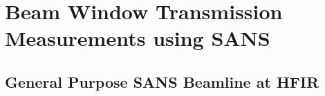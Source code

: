 





\section{Beam Window Transmission Measurements using SANS}

\subsection{General Purpose SANS Beamline at HFIR}

